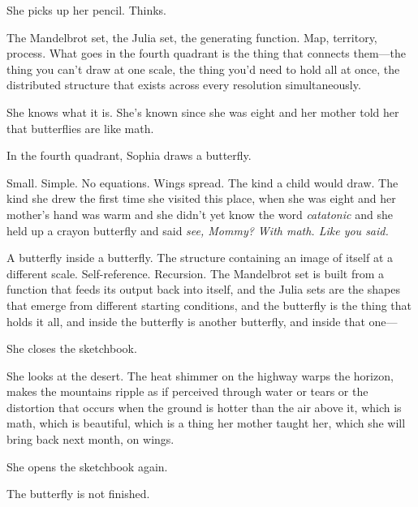 She picks up her pencil. Thinks.

The Mandelbrot set, the Julia set, the generating function. Map, territory, process. What goes in the fourth quadrant is the thing that connects them---the thing you can't draw at one scale, the thing you'd need to hold all at once, the distributed structure that exists across every resolution simultaneously.

She knows what it is. She's known since she was eight and her mother told her that butterflies are like math.

In the fourth quadrant, Sophia draws a butterfly.

Small. Simple. No equations. Wings spread. The kind a child would draw. The kind she drew the first time she visited this place, when she was eight and her mother's hand was warm and she didn't yet know the word \textit{catatonic} and she held up a crayon butterfly and said \textit{see, Mommy? With math. Like you said.}

A butterfly inside a butterfly. The structure containing an image of itself at a different scale. Self-reference. Recursion. The Mandelbrot set is built from a function that feeds its output back into itself, and the Julia sets are the shapes that emerge from different starting conditions, and the butterfly is the thing that holds it all, and inside the butterfly is another butterfly, and inside that one---

She closes the sketchbook.

She looks at the desert. The heat shimmer on the highway warps the horizon, makes the mountains ripple as if perceived through water or tears or the distortion that occurs when the ground is hotter than the air above it, which is math, which is beautiful, which is a thing her mother taught her, which she will bring back next month, on wings.

She opens the sketchbook again.

The butterfly is not finished.

